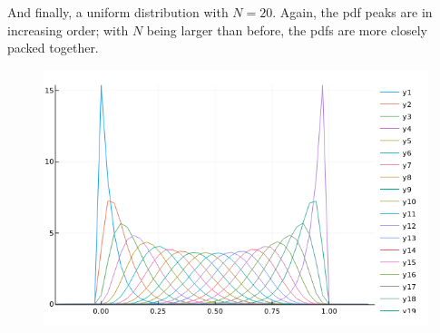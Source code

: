 And finally, a uniform distribution with $N=20$. Again, the pdf peaks are in increasing order; with $N$ being larger than before, the pdfs are more closely packed together.

\begin{figure}[H]
	\centering
	\includegraphics[scale=0.7]{images/order_stat_2_4.png}
\end{figure}
